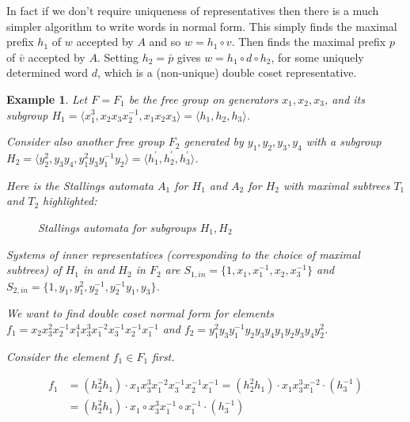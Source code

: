 \documentclass[a4paper,12pt]{article}
\newtheorem{exam}[theorem]{Example}
\newenvironment{example}{\begin{exam} \rm}{\end{exam}}
\numberwithin{equation}{section}
\numberwithin{figure}{section}
\newcommand{\la}{\langle}
\newcommand{\ra}{\rangle}
\begin{document}
In fact if we don't require uniqueness of representatives then there is
a much simpler algorithm to write words in normal form.
This
simply finds the maximal prefix $h_1$ of $w$  accepted  by $A$  and so $w=h_1\circ v$. Then finds the
maximal prefix $p$ of $\bar v$ accepted by $A$. Setting $h_2=\bar p$ gives $w=h_1\circ d \circ h_2$, for
some uniquely determined word $d$, which is a (non-unique)
double coset representative.


\begin{example}\label{ex:f_1f_2}
Let $F=F_1$ be the free group on generators $x_1,x_2,x_3$, and its
subgroup $H_1=\la x_1^3,x_2x_3x_2^{-1},x_1x_2x_3\ra = \la
h_1,h_2,h_3\ra$.

Consider also another free group $F_2$ generated by
$y_1,y_2,y_3,y_4$ with a subgroup $H_2 = \la
y_2^2,y_3y_4,y_1^2y_3y_1^{-1}y_2\ra = \la h_1^{\prime},
h_2^{\prime},h_3^{\prime}\ra$.

Here is the Stallings automata $A_1$ for $H_1$ and $A_2$ for $H_2$
with maximal subtrees $T_1$ and $T_2$ highlighted:

\begin{figure}
\begin{center}
 \hspace{15mm} 
\end{center}
\caption{Stallings automata for subgroups $H_1,
H_2$}\label{fig:stall}
\end{figure}

Systems of inner representatives (corresponding to the choice of
maximal subtrees) of $H_1$ in and $H_2$ in $F_2$
 are $S_{1,in} = \{1,x_1,x_1^{-1},x_2,x_3^{-1} \}$ and $S_{2,in} = \{1, y_1, y_1^2,
y_2^{-1}, y_2^{-1}y_1, y_3 \}$.

We want to find double coset normal form for elements $f_1 =
x_2x_3^2x_2^{-1} x_1^4x_3^3x_1^{-2}x_3^{-1}x_2^{-1}x_1^{-1}$ and
$f_2=y_1^2y_3y_1^{-1}y_2y_3y_4y_1y_2 y_3y_4y_2^2$.

Consider the element $f_1 \in F_1$ first.

\begin{align*}
f_1 &= (h_2^2h_1)\cdot x_1x_3^3x_1^{-2}x_3^{-1}x_2^{-1}x_1^{-1} =
(h_2^2h_1)\cdot x_1x_3^3x_1^{-2}\cdot(h_3^{-1})\\
&= (h_2^2h_1)\cdot x_1 \circ x_3^3x_1^{-1}\circ
x_1^{-1}\cdot(h_3^{-1})
\end{align*}


\end{example}
\end{document}
